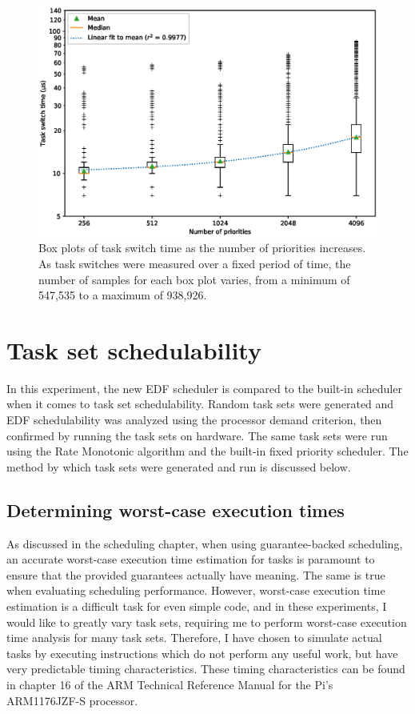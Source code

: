 \documentclass[twoside]{uva-inf-bachelor-thesis}
\begin{document}
\begin{figure}[htpb]
    \centering
    \includegraphics[width=\textwidth]{boxplot.eps}
    \caption{Box plots of task switch time as the number of priorities increases. As task switches were measured over a fixed period of time, the number of samples for each box plot varies, from a minimum of 547,535 to a maximum of 938,926.}
    \label{fig:prioboxplot}
\end{figure}

\section{Task set schedulability}
In this experiment, the new EDF scheduler is compared to the built-in scheduler when it comes to task set schedulability. Random task sets were generated and EDF schedulability was analyzed using the processor demand criterion, then confirmed by running the task sets on hardware. The same task sets were run using the Rate Monotonic algorithm and the built-in fixed priority scheduler. The method by which task sets were generated and run is discussed below.

\subsection{Determining worst-case execution times}
As discussed in the scheduling chapter, when using guarantee-backed scheduling, an accurate worst-case execution time estimation for tasks is paramount to ensure that the provided guarantees actually have meaning. The same is true when evaluating scheduling performance. However, worst-case execution time estimation is a difficult task for even simple code, and in these experiments, I would like to greatly vary task sets, requiring me to perform worst-case execution time analysis for many task sets. Therefore, I have chosen to simulate actual tasks by executing instructions which do not perform any useful work, but have very predictable timing characteristics. These timing characteristics can be found in chapter 16 of the ARM Technical Reference Manual for the Pi's ARM1176JZF-S processor\cite{arm:arm1176}.\\
\end{document}
